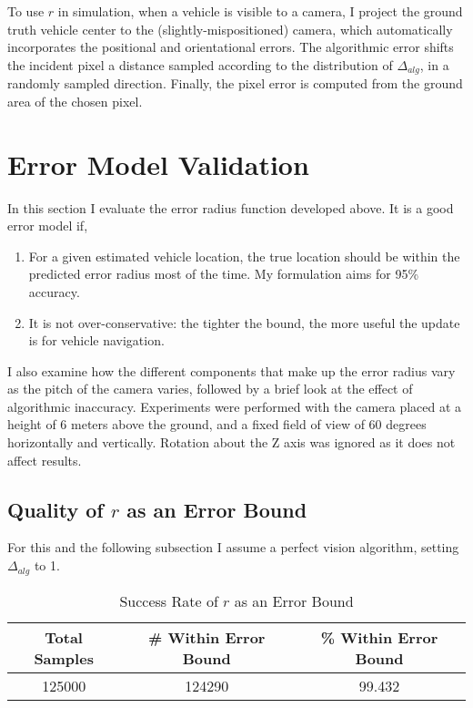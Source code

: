 \documentclass[a4paper,12pt,twoside,openright]{report}
\begin{document}
To use $r$ in simulation, when a vehicle is visible to a camera,
I project the ground truth vehicle center to the (slightly-mispositioned) camera, which
automatically incorporates the positional and orientational errors.
The algorithmic error shifts the incident pixel a distance sampled according to the distribution 
of $\Delta_{alg}$, in a randomly sampled direction. 
Finally, the pixel error is computed from the ground area of the chosen pixel.

\section{Error Model Validation}
\label{sec:camera:validation}

In this section I evaluate the error radius function developed above. It is a good error model if,

\begin{enumerate}
    \item For a given estimated vehicle location, the true location should be within the predicted
          error radius most of the time. My formulation aims for 95\% accuracy.
    \item It is not over-conservative: the tighter the bound, the more useful the update is
          for vehicle navigation.
\end{enumerate}

I also examine how the different components that make up the error radius vary
as the pitch of the camera varies, followed by a brief look at the
effect of algorithmic inaccuracy. Experiments were performed
with the camera placed at a height of 6 meters above the ground, and a fixed
field of view of 60 degrees horizontally and vertically. Rotation about the Z axis
was ignored as it does not affect results.

\subsection{Quality of $r$ as an Error Bound}

For this and the following subsection I assume a perfect vision algorithm,
setting $\Delta_{alg}$ to 1.

\begin{table}[htb]
    \centering
    \caption[$r$ as an Error Bound]{Success Rate of $r$ as an Error Bound}
    \label{tab:camera:bound accuracy}
    \begin{tabular}{@{}ccc@{}}
        \toprule
        Total Samples & \# Within Error Bound & \% Within Error Bound \\ \midrule
        125000              & 124290                  & 99.432 
    \end{tabular}
\end{table}
\end{document}
